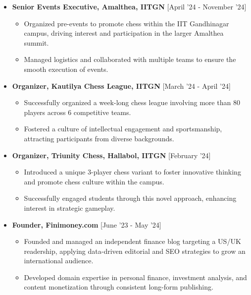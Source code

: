 \documentclass[a4paper,10pt]{article}
\newcommand{\isep}{-2 pt}
\begin{document}
\begin{itemize}
    \item \textbf{Senior Events Executive, Amalthea, IITGN} \hfill [April '24 - November '24]\\[-0.7cm]
    \begin{itemize}\itemsep \isep
        \item Organized pre-events to promote chess within the IIT Gandhinagar campus, driving interest and participation in the larger Amalthea summit.
        \item Managed logistics and collaborated with multiple teams to ensure the smooth execution of events.
    \end{itemize}

    \item \textbf{Organizer, Kautilya Chess League, IITGN} \hfill [March '24 - April '24]\\[-0.7cm]
    \begin{itemize}\itemsep \isep
        \item Successfully organized a week-long chess league involving more than 80 players across 6 competitive teams.
        \item Fostered a culture of intellectual engagement and sportsmanship, attracting participants from diverse backgrounds.
    \end{itemize}

    \item \textbf{Organizer, Triunity Chess, Hallabol, IITGN} \hfill [February '24]\\[-0.7cm]
    \begin{itemize}\itemsep \isep
        \item Introduced a unique 3-player chess variant to foster innovative thinking and promote chess culture within the campus.
        \item Successfully engaged students through this novel approach, enhancing interest in strategic gameplay.
    \end{itemize}

    \item \textbf{Founder, Finimoney.com} \hfill [June '23 - May '24]\\[-0.7cm]
    \begin{itemize}\itemsep \isep
        \item Founded and managed an independent finance blog targeting a US/UK readership, applying data-driven editorial and SEO strategies to grow an international audience.
        \item Developed domain expertise in personal finance, investment analysis, and content monetization through consistent long-form publishing.
    \end{itemize}


\end{itemize}
\end{document}
